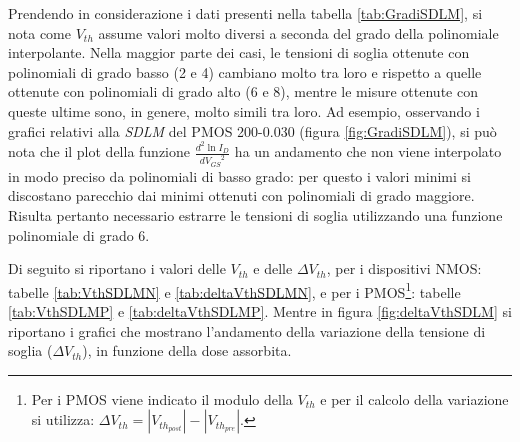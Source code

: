 Prendendo in considerazione i dati presenti nella tabella \ref{tab:GradiSDLM}, si nota come $V_{th}$ assume valori molto diversi a seconda del grado della polinomiale interpolante. Nella maggior parte dei casi, le tensioni di soglia ottenute con polinomiali di grado basso (2 e 4) cambiano molto tra loro e rispetto a quelle ottenute con polinomiali di grado alto (6 e 8), mentre le misure ottenute con queste ultime sono, in genere, molto simili tra loro. Ad esempio, osservando i grafici relativi alla \emph{SDLM} del PMOS 200-0.030 (figura \ref{fig:GradiSDLM}), si può nota che il plot della funzione $\frac{d^2 \ln I_D}{d{V_{GS}}^2}$ ha un andamento che non viene interpolato in modo preciso da polinomiali di basso grado: per questo i valori minimi si discostano parecchio dai minimi ottenuti con polinomiali di grado maggiore. Risulta pertanto necessario estrarre le tensioni di soglia utilizzando una funzione polinomiale di grado 6.

Di seguito si riportano i valori delle $V_{th}$ e delle $\Delta V_{th}$, per i dispositivi NMOS: tabelle \ref{tab:VthSDLMN} e \ref{tab:deltaVthSDLMN}, e per i PMOS\footnote{Per i PMOS viene indicato il modulo della $V_{th}$ e per il calcolo della variazione si utilizza: $\Delta V_{th} = |V_{th_{post}}| - |V_{th_{pre}}|$.}: tabelle \ref{tab:VthSDLMP} e \ref{tab:deltaVthSDLMP}. Mentre in figura \ref{fig:deltaVthSDLM} si riportano i grafici che mostrano l'andamento della variazione della tensione di soglia ($\Delta V_{th}$), in funzione della dose assorbita.

\clearpage


